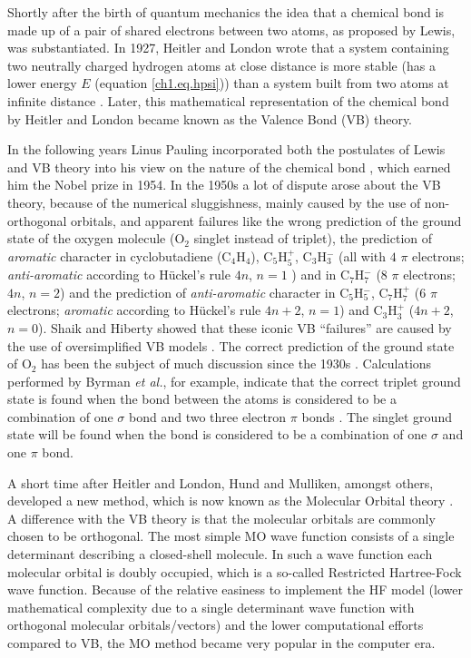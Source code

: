 Shortly after the birth of quantum mechanics the idea that a chemical bond is made up of a pair of shared electrons between two atoms, as proposed by Lewis, was substantiated. In 1927, Heitler and London wrote that a system containing two neutrally charged hydrogen atoms at close distance is more stable (has a lower energy $E$ (equation \ref{ch1.eq.hpsi})) than a system built from two atoms at infinite distance \cite{heitler}. Later, this mathematical representation of the chemical bond by Heitler and London became known as the Valence Bond (VB) theory. 

In the following years Linus Pauling incorporated both the postulates of Lewis and VB theory into his view on the nature of the chemical bond \cite{pauling1,pauling2,pauling3,pauling4,pauling5,pauling6,pauling7,paulingbook}, which earned him the Nobel prize in 1954. In the 1950s a lot of dispute arose about the VB theory, because of the numerical sluggishness, mainly caused by the use of non-orthogonal orbitals, and apparent failures like the wrong prediction of the ground state of the oxygen molecule (O$_2$ singlet instead of triplet), the prediction of \textit{aromatic} character in cyclobutadiene (C$_4$H$_4$), C$_5$H$_{5}^{+}$, C$_3$H$_{3}^{-}$ (all with $4$ $\pi$ electrons; \textit{anti-aromatic} according to H\"{u}ckel's rule $4n$, $n=1$ \cite{march}) and in C$_7$H$_{7}^{-}$ (8 $\pi$ electrons; $4n$, $n=2$) and the prediction of \textit{anti-aromatic} character in C$_5$H$_{5}^{-}$, C$_7$H$_{7}^{+}$ (6 $\pi$ electrons; \textit{aromatic} according to H\"{u}ckel's rule $4n+2$, $n=1$) and C$_3$H$_{3}^{+}$ ($4n+2$, $n=0$). Shaik and Hiberty showed that these iconic VB ``failures'' are caused by the use of oversimplified VB models \cite{antibrush}. The correct prediction of the ground state of O$_2$ has been the subject of much discussion since the 1930s \cite{o2_1,o2_2,o2_3,o2_4,o2_5,o2_6,o2_7,o2_8,o2_9,carsten}. Calculations performed by Byrman \textit{et al.}, for example, indicate that the correct triplet ground state is found when the bond between the atoms is considered to be a combination of one $\sigma$ bond and two three electron $\pi$ bonds \cite{carsten}. The singlet ground state will be found when the bond is considered to be a combination of one $\sigma$ and one $\pi$ bond.

A short time after Heitler and London, Hund and Mulliken, amongst others, developed a new method, which is now known as the Molecular Orbital theory \cite{hund,mulliken}. A difference with the VB theory is that the molecular orbitals are commonly chosen to be orthogonal. The most simple MO wave function consists of a single determinant describing a closed-shell molecule. In such a wave function each molecular orbital is doubly occupied, which is a so-called Restricted Hartree-Fock \cite{fock} wave function. Because of the relative easiness to implement the HF model (lower mathematical complexity due to a single determinant wave function with orthogonal molecular orbitals/vectors) and the lower computational efforts compared to VB, the MO method became very popular in the computer era.

